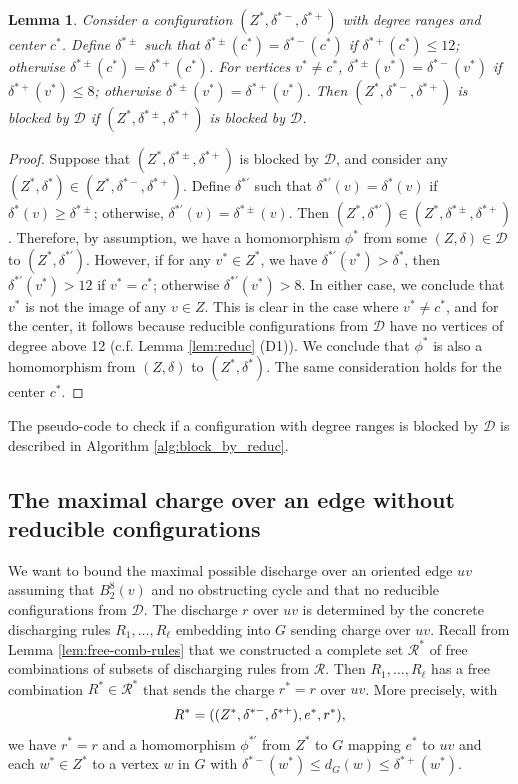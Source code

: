 \documentclass[10pt,a4paper]{article}
\newtheorem{lem}[thm]{Lemma}
\def\cR{{\mathcal R}}
\def\cD{{\mathcal D}}
\begin{document}
\begin{lem}\label{lem:bounded-ranges}
Consider a configuration  $(Z^*,\delta^{*-},\delta^{*+})$
with degree ranges and center $c^*$. Define
$\delta^{*\pm}$ such
that $\delta^{*\pm}(c^*)=\delta^{*-}(c^*)$ if $\delta^{*+}(c^*)\leq 12$; otherwise $\delta^{*\pm}(c^*)=\delta^{*+}(c^*)$. For vertices $v^*\neq c^*$,
$\delta^{*\pm}(v^*)=\delta^{*-}(v^*)$ if $\delta^{*+}(v^*)\leq 8$; otherwise $\delta^{*\pm}(v^*)=\delta^{*+}(v^*)$. Then
$(Z^*,\delta^{*-},\delta^{*+})$
is
blocked by $\cD$ if $(Z^*,\delta^{*\pm},\delta^{*+})$
is blocked by $\cD$.
\end{lem}
\begin{proof}
Suppose that $(Z^*,\delta^{*\pm},\delta^{*+})$
is blocked by $\cD$, and consider any $(Z^*,\delta^*)\in (Z^*,\delta^{*-},\delta^{*+})$.
Define $\delta^{*\prime}$ such that
$\delta^{*\prime}(v)=\delta^*(v)$ if $\delta^*(v)\geq \delta^{*\pm}$; otherwise,
$\delta^{*\prime}(v)=\delta^{*\pm}(v)$. Then $(Z^*,\delta^{*\prime})\in (Z^*,\delta^{*\pm},\delta^{*+})$. Therefore, by assumption,
we have a homomorphism $\phi^*$
from some $(Z,\delta)\in \cD$
to $(Z^*,\delta^{*\prime})$.
However, if for any $v^*\in Z^*$,
we have $\delta^{*\prime}(v^*)>\delta^*$, then 
$\delta^{*\prime}(v^*)>12$ if
$v^*=c^*$; otherwise $\delta^{*\prime}(v^*)>8$. In either case, we conclude that
$v^*$ is not the image of any $v\in Z$. This is clear in the
case where $v^*\neq c^*$, and for the center, it follows because reducible configurations from $\cD$ have no vertices of degree above 12 (c.f. Lemma \ref{lem:reduc} (D1)). We conclude that $\phi^*$ is also
a homomorphism from $(Z,\delta)$ to $(Z^*,\delta^*)$.
The same consideration holds for the center $c^*$.
\end{proof}

The pseudo-code to check if a configuration with degree ranges is blocked by $\cD$ 
is described in Algorithm \ref{alg:block_by_reduc}. 




\subsection{The maximal charge over an edge without reducible configurations}
\label{sub:max_without_reduc}


We want to bound the maximal possible discharge
over an oriented edge $uv$ assuming that $B^8_2(v)$ and no obstructing cycle and that no reducible configurations
from $\cD$. 
The discharge $r$ over $uv$ is determined by the concrete discharging rules $R_1,\ldots,R_\ell$
embedding into $G$ sending charge over $uv$. Recall from Lemma \ref{lem:free-comb-rules} that we constructed a
complete set $\cR^*$ of free combinations of subsets of discharging rules from $\cR$. Then $R_1,\ldots,R_\ell$
has a free combination $R^*\in\cR^*$
that sends the charge $r^*=r$ over $uv$. More precisely, with
\[R^*=((Z^*,\delta^{*-},\delta^{*+}),e^*,r^*)\textnormal,\]
we have $r^*=r$ and a homomorphism $\phi^{*\prime}$ from $Z^*$ to $G$ mapping
$e^*$ to $uv$ and each $w^*\in Z^*$ to 
a vertex $w$ in $G$ with $\delta^{*-}(w^*)\leq d_G(w)\leq \delta^{*+}(w^*)$. 
\end{document}
